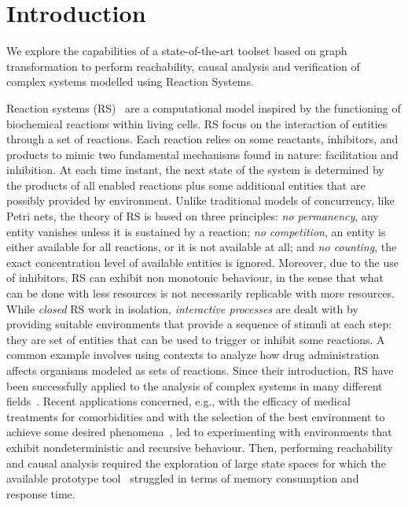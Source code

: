 
\section{Introduction}

We explore the capabilities of a state-of-the-art toolset based on graph transformation to perform reachability, causal analysis and verification of complex systems modelled using Reaction Systems.

Reaction systems (RS)~\cite{DBLP:journals/fuin/EhrenfeuchtR07} are a computational model inspired by the functioning of biochemical reactions within living cells. 
RS focus on the interaction of entities through a set of reactions. 
Each reaction relies on some reactants, inhibitors, and products to mimic two fundamental mechanisms found in nature: facilitation and inhibition.
At each time instant, the next state of the system is determined by the products of all enabled reactions plus some additional entities that are possibly provided by environment.
Unlike traditional models of concurrency, like Petri nets, the theory of RS is based on three principles: \emph{no permanency}, any entity vanishes unless it is sustained by a reaction; \emph{no competition}, an entity is either available for all reactions, or it is not available at all; and \emph{no counting}, the exact concentration level of available entities is ignored.
Moreover, due to the use of inhibitors, RS can exhibit non monotonic behaviour, in the sense that what can be done with less resources is not necessarily replicable with more resources.
While \emph{closed} RS work in isolation, \emph{interactive processes} are dealt with by providing suitable environments that provide a sequence of stimuli at each step: they are set of entities that can be used to trigger or inhibit some reactions. A common example involves using contexts to analyze how drug administration affects organisms modeled as sets of reactions.
Since their introduction, RS have been successfully applied to the analysis of complex systems in many different fields~\cite{ABP14,CMMBM12,Az17,OY16,DBLP:journals/ijfcs/EhrenfeuchtMR10,DBLP:journals/ijfcs/EhrenfeuchtMR11}.
Recent applications concerned, e.g., with the efficacy of medical treatments for comorbidities and with the selection of the best environment to achieve some desired phenomena~\cite{DBLP:conf/cmsb/BowlesBBFGM24,datamod2023}, led to experimenting with environments that exhibit nondeterministic and recursive behaviour.
Then, performing reachability and causal analysis required the exploration of large state spaces for which the available prototype tool~\cite{DBLP:journals/tcs/BrodoBF21} struggled in terms of  memory consumption and response time.
 
